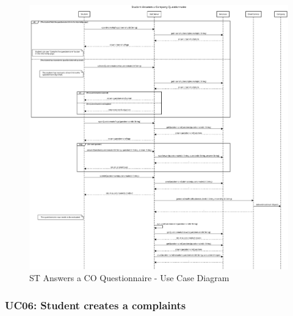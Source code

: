\begin{figure}[H]
    \centering
    \includegraphics[width=1.0\textwidth]{Images/UC_5.pdf}
    \caption{ST Answers a CO Questionnaire - Use Case Diagram}
    \label{fig:use-case-diagram-5}
\end{figure}


\subsubsection{UC06: Student creates a complaints}
\label{subsubsec:student-creates-a-complaints}

